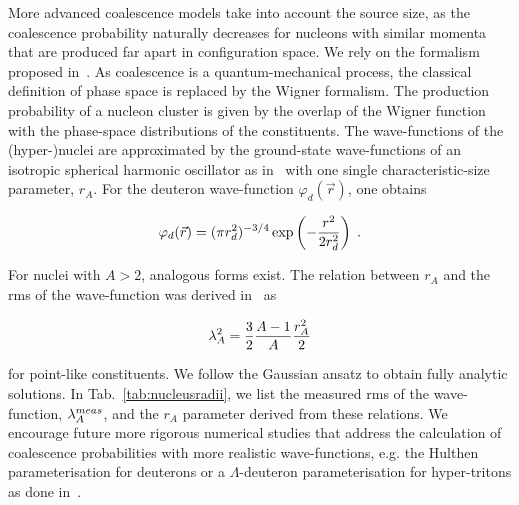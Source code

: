 \documentclass[%
 reprint,
 amsmath,amssymb,
 aps,
]{revtex4-1}
\begin{document}
More advanced coalescence models \cite{Sato:1981ez, Nagle:1996vp, Scheibl:1998tk} take into account the source size, as the coalescence probability naturally decreases for nucleons with similar momenta that are produced far apart in configuration space. We rely on the formalism proposed in~\cite{Scheibl:1998tk}.
As coalescence is a quantum-mechanical process, the classical definition of phase space is replaced by the Wigner formalism. The production probability of a nucleon cluster is given by the overlap of the Wigner function with the phase-space distributions of the constituents.
The wave-functions of the (hyper-)nuclei are approximated by the ground-state wave-functions of an isotropic spherical harmonic oscillator as in~\cite{Scheibl:1998tk} with one single characteristic-size parameter, $r_{A}$. 
For the deuteron wave-function $\varphi_{d}(\vec{r}) $, one obtains

\begin{equation}\label{eq:WaveHeinz}
 \varphi_{d}(\vec{r}) = (\pi r_{d}^2)^{-3/4} \exp\left(-{r^2 \over 2 r_{d}^2}\right) \;.
\end{equation}

\noindent For nuclei with $A > 2$, analogous forms exist. The relation between $r_{A}$ and the rms of the wave-function was derived in~\cite{Shebeko:2006ud} as

\begin{equation}
 \lambda_{A}^2 = {3 \over 2}{A - 1 \over A} {r_{A}^2 \over 2}
\end{equation} 

\noindent for point-like constituents. 
We follow the Gaussian ansatz to obtain fully analytic solutions.
In Tab.~\ref{tab:nucleusradii}, we list the measured rms of the wave-function, $\lambda_{A}^{meas}$, and the $r_{A}$ parameter derived from these relations. 
We encourage future more rigorous numerical studies that address the calculation of coalescence probabilities with more realistic wave-functions, e.g. the Hulthen parameterisation for deuterons \cite{Nagle:1996vp} or a $\Lambda$-deuteron parameterisation for hyper-tritons as done in~\cite{Zhang:2018euf, Sun:2018mqq}. 
\end{document}
